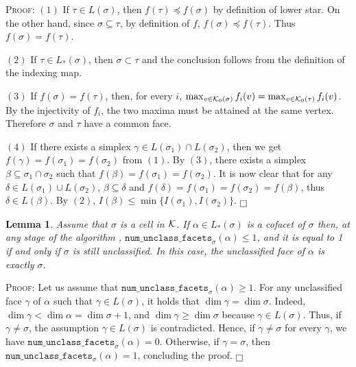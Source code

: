 \documentclass[12pt]{article}
\newtheorem{lem}[thm]{Lemma}
\newenvironment{proof}{\noindent\textsc{Proof: }}{\hfill$\fbox{}$\par\medskip\par}
\newcommand{\cK}{{\cal K}}
\begin{document}
\begin{proof}
$(1)$ If $\tau\in L(\sigma)$, then $f(\tau)\preceq f(\sigma)$ by definition of lower star. On the other hand,  since
$\sigma\subseteq \tau$, by definition of $f$, $f(\sigma)\preceq f(\tau)$. Thus $f(\sigma)=f(\tau)$.

\noindent
$(2)$ If $\tau\in L_*(\sigma)$, then $\sigma\subset \tau$ and the conclusion follows from the definition of the indexing map.

\noindent
$(3)$ If $f(\sigma)=f(\tau)$, then, for every $i$, $\max_{v\in\cK_0(\sigma)}f_i(v)=\max_{v\in\cK_0(\tau)}f_i(v)$. By
the injectivity of $f_i$, the two maxima must be attained at the same vertex. Therefore $\sigma$ and $\tau$ have a common face.

\noindent
$(4)$  If  there exists a simplex
$\gamma \in L(\sigma_1) \cap L(\sigma_2)$, then  we get $f(\gamma) = f(\sigma_1) = f(\sigma_2)$ from $(1)$. By  $(3)$,
there exists a simplex $\beta \subseteq \sigma_1 \cap \sigma_2$ such that $f(\beta) = f(\sigma_1) = f(\sigma_2)$. It is now clear that for any
$\delta \in L(\sigma_1) \cup L(\sigma_2)$, $\beta \subseteq \delta$ and  $f(\delta) = f(\sigma_1) = f(\sigma_2) = f(\beta)$, thus
$\delta \in L(\beta)$. By $(2)$, $I(\beta) \leq \min \{ I(\sigma_1), I(\sigma_2)\}$.
\end{proof}

\begin{lem}\label{lem:correctness1}
Assume that $\sigma$ is a cell in $\cK$. If $\alpha \in L_* (\sigma)$ is a cofacet of $\sigma$ then, at any stage of the algorithm , $\texttt{{num}\_{unclass}\_{facets}}_{\sigma} (\alpha)\le 1$, and it is equal to 1 if and only if $\sigma$ is still unclassified. In this case, the unclassified face of $\alpha$ is exactly $\sigma$.
\end{lem}

\begin{proof}
Let us assume that $\texttt{{num}\_{unclass}\_{facets}}_{\sigma} (\alpha)\ge 1$. For any unclassified face  $\gamma$ of $\alpha$ such that $\gamma \in L(\sigma)$, it holds that
$\dim \gamma = \dim \sigma$. Indeed, $\dim \gamma<\dim \alpha=\dim\sigma+1$, and $\dim\gamma\ge \dim\sigma$ because $\gamma\in L(\sigma)$. Thus, if $\gamma\ne \sigma$, the assumption $\gamma \in L(\sigma)$ is contradicted. Hence, if $\gamma\ne \sigma$ for every $\gamma$, we have $\texttt{{num}\_{unclass}\_{facets}}_{\sigma} (\alpha)=0$.  Otherwise, if $\gamma=\sigma$, then $\texttt{{num}\_{unclass}\_{facets}}_{\sigma} (\alpha)= 1$, concluding the proof.
\end{proof}
\end{document}

